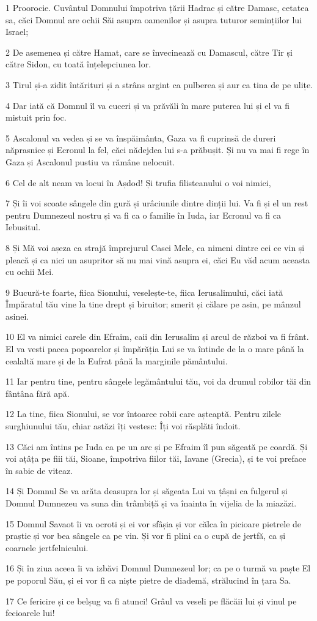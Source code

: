 \par 1 Proorocie. Cuvântul Domnului împotriva țării Hadrac și către Damasc, cetatea sa, căci Domnul are ochii Săi asupra oamenilor și asupra tuturor semințiilor lui Israel;
\par 2 De asemenea și către Hamat, care se învecinează cu Damascul, către Tir și către Sidon, cu toată înțelepciunea lor.
\par 3 Tirul și-a zidit întărituri și a strâns argint ca pulberea și aur ca tina de pe ulițe.
\par 4 Dar iată că Domnul îl va cuceri și va prăvăli în mare puterea lui și el va fi mistuit prin foc.
\par 5 Ascalonul va vedea și se va înspăimânta, Gaza va fi cuprinsă de dureri năprasnice și Ecronul la fel, căci nădejdea lui s-a prăbușit. Și nu va mai fi rege în Gaza și Ascalonul pustiu va rămâne nelocuit.
\par 6 Cel de alt neam va locui în Așdod! Și trufia filisteanului o voi nimici,
\par 7 Și îi voi scoate sângele din gură și urâciunile dintre dinții lui. Va fi și el un rest pentru Dumnezeul nostru și va fi ca o familie în Iuda, iar Ecronul va fi ca Iebusitul.
\par 8 Și Mă voi așeza ca strajă împrejurul Casei Mele, ca nimeni dintre cei ce vin și pleacă și ca nici un asupritor să nu mai vină asupra ei, căci Eu văd acum aceasta cu ochii Mei.
\par 9 Bucură-te foarte, fiica Sionului, veselește-te, fiica Ierusalimului, căci iată Împăratul tău vine la tine drept și biruitor; smerit și călare pe asin, pe mânzul asinei.
\par 10 El va nimici carele din Efraim, caii din Ierusalim și arcul de război va fi frânt. El va vesti pacea popoarelor și împărăția Lui se va întinde de la o mare până la cealaltă mare și de la Eufrat până la marginile pământului.
\par 11 Iar pentru tine, pentru sângele legământului tău, voi da drumul robilor tăi din fântâna fără apă.
\par 12 La tine, fiica Sionului, se vor întoarce robii care așteaptă. Pentru zilele surghiunului tău, chiar astăzi îți vestesc: Îți voi răsplăti îndoit.
\par 13 Căci am întins pe Iuda ca pe un arc și pe Efraim îl pun săgeată pe coardă. Și voi ațâța pe fiii tăi, Sioane, împotriva fiilor tăi, Iavane (Grecia), și te voi preface în sabie de viteaz.
\par 14 Și Domnul Se va arăta deasupra lor și săgeata Lui va țâșni ca fulgerul și Domnul Dumnezeu va suna din trâmbiță și va înainta în vijelia de la miazăzi.
\par 15 Domnul Savaot îi va ocroti și ei vor sfâșia și vor călca în picioare pietrele de praștie și vor bea sângele ca pe vin. Și vor fi plini ca o cupă de jertfă, ca și coarnele jertfelnicului.
\par 16 Și în ziua aceea îi va izbăvi Domnul Dumnezeul lor; ca pe o turmă va paște El pe poporul Său, și ei vor fi ca niște pietre de diademă, strălucind în țara Sa.
\par 17 Ce fericire și ce belșug va fi atunci! Grâul va veseli pe flăcăii lui și vinul pe fecioarele lui!

